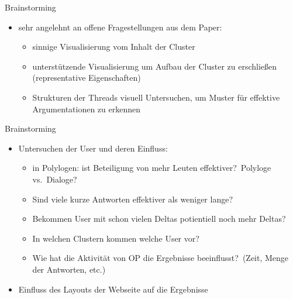 \documentclass[compress,12pt]{beamer}
\begin{document}
    \begin{frame}{Brainstorming}
        \begin{itemize}
            \item sehr angelehnt an offene Fragestellungen aus dem Paper:
            \begin{itemize}
                \item sinnige Visualisierung vom Inhalt der Cluster
                \item unterstützende Visualisierung um Aufbau der Cluster zu erschließen (representative Eigenschaften)
                \item Strukturen der Threads visuell Untersuchen, um Muster für effektive Argumentationen zu erkennen
            \end{itemize}
        \end{itemize}
    \end{frame}

    \begin{frame}{Brainstorming}
        \begin{itemize}
            \item Untersuchen der User und deren Einfluss:
            \begin{itemize}
                \item in Polylogen: ist Beteiligung von mehr Leuten effektiver?\ Polyloge vs.\ Dialoge?
                \item Sind viele kurze Antworten effektiver als weniger lange?
                \item Bekommen User mit schon vielen Deltas potientiell noch mehr Deltas?
                \item In welchen Clustern kommen welche User vor?
                \item Wie hat die Aktivität von OP die Ergebnisse beeinflusst?\ (Zeit, Menge der Antworten, etc.)
            \end{itemize}
            \item Einfluss des Layouts der Webseite auf die Ergebnisse
        \end{itemize}
    \end{frame}
\end{document}
